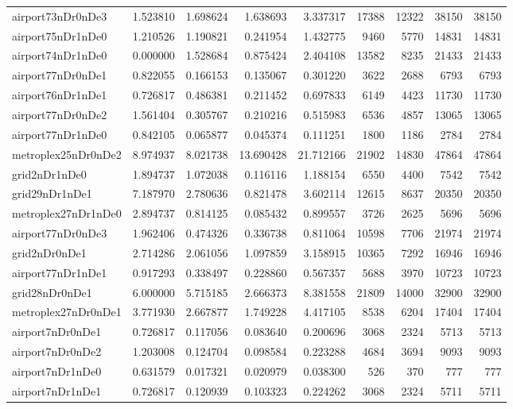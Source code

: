 \begin{longtable}{|l|r|r|r|r|r|r|r|r|}
airport73nDr0nDe3 & 1.523810 & 1.698624 & 1.638693 & 3.337317 & 17388 & 12322 & 38150 & 38150 \\
airport75nDr1nDe0 & 1.210526 & 1.190821 & 0.241954 & 1.432775 & 9460 & 5770 & 14831 & 14831 \\
airport74nDr1nDe0 & 0.000000 & 1.528684 & 0.875424 & 2.404108 & 13582 & 8235 & 21433 & 21433 \\
airport77nDr0nDe1 & 0.822055 & 0.166153 & 0.135067 & 0.301220 & 3622 & 2688 & 6793 & 6793 \\
airport76nDr1nDe1 & 0.726817 & 0.486381 & 0.211452 & 0.697833 & 6149 & 4423 & 11730 & 11730 \\
airport77nDr0nDe2 & 1.561404 & 0.305767 & 0.210216 & 0.515983 & 6536 & 4857 & 13065 & 13065 \\
airport77nDr1nDe0 & 0.842105 & 0.065877 & 0.045374 & 0.111251 & 1800 & 1186 & 2784 & 2784 \\
metroplex25nDr0nDe2 & 8.974937 & 8.021738 & 13.690428 & 21.712166 & 21902 & 14830 & 47864 & 47864 \\
grid2nDr1nDe0 & 1.894737 & 1.072038 & 0.116116 & 1.188154 & 6550 & 4400 & 7542 & 7542 \\
grid29nDr1nDe1 & 7.187970 & 2.780636 & 0.821478 & 3.602114 & 12615 & 8637 & 20350 & 20350 \\
metroplex27nDr1nDe0 & 2.894737 & 0.814125 & 0.085432 & 0.899557 & 3726 & 2625 & 5696 & 5696 \\
airport77nDr0nDe3 & 1.962406 & 0.474326 & 0.336738 & 0.811064 & 10598 & 7706 & 21974 & 21974 \\
grid2nDr0nDe1 & 2.714286 & 2.061056 & 1.097859 & 3.158915 & 10365 & 7292 & 16946 & 16946 \\
airport77nDr1nDe1 & 0.917293 & 0.338497 & 0.228860 & 0.567357 & 5688 & 3970 & 10723 & 10723 \\
grid28nDr0nDe1 & 6.000000 & 5.715185 & 2.666373 & 8.381558 & 21809 & 14000 & 32900 & 32900 \\
metroplex27nDr0nDe1 & 3.771930 & 2.667877 & 1.749228 & 4.417105 & 8538 & 6204 & 17404 & 17404 \\
airport7nDr0nDe1 & 0.726817 & 0.117056 & 0.083640 & 0.200696 & 3068 & 2324 & 5713 & 5713 \\
airport7nDr0nDe2 & 1.203008 & 0.124704 & 0.098584 & 0.223288 & 4684 & 3694 & 9093 & 9093 \\
airport7nDr1nDe0 & 0.631579 & 0.017321 & 0.020979 & 0.038300 & 526 & 370 & 777 & 777 \\
airport7nDr1nDe1 & 0.726817 & 0.120939 & 0.103323 & 0.224262 & 3068 & 2324 & 5711 & 5711 \\

\end{longtable}

